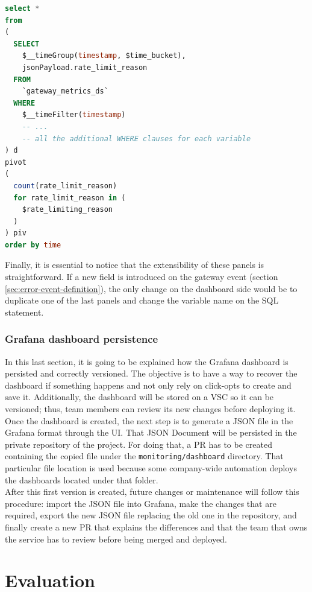 \documentclass[english, 12pt, a4paper, sci, utf8, a-1b, online]{aaltothesis}
\begin{document}
\begin{lstlisting}[language=sql,firstnumber=1]
select *
from
(
  SELECT
    $__timeGroup(timestamp, $time_bucket),
    jsonPayload.rate_limit_reason
  FROM 
    `gateway_metrics_ds`
  WHERE 
    $__timeFilter(timestamp)
    -- ...
    -- all the additional WHERE clauses for each variable
) d
pivot
(
  count(rate_limit_reason)
  for rate_limit_reason in (
    $rate_limiting_reason
  )
) piv
order by time
\end{lstlisting}

Finally, it is essential to notice that the extensibility of these panels is straightforward. If a new field is introduced on the gateway event (section \ref{sec:error-event-definition}), the only change on the dashboard side would be to duplicate one of the last panels and change the variable name on the SQL statement.

\subsubsection{Grafana dashboard persistence}

In this last section, it is going to be explained how the Grafana dashboard is persisted and correctly versioned. The objective is to have a way to recover the dashboard if something happens and not only rely on click-opts to create and save it. Additionally, the dashboard will be stored on a VSC so it can be versioned; thus, team members can review its new changes before deploying it.\\

Once the dashboard is created, the next step is to generate a JSON file in the Grafana format \cite{GrafanaJson} through the UI. That JSON Document will be persisted in the private repository of the project. For doing that, a PR has to be created containing the copied file under the \texttt{monitoring/dashboard} directory. That particular file location is used because some company-wide automation deploys the dashboards located under that folder.\\

After this first version is created, future changes or maintenance will follow this procedure: import the JSON file into Grafana, make the changes that are required, export the new JSON file replacing the old one in the repository, and finally create a new PR that explains the differences and that the team that owns the service has to review before being merged and deployed.

\clearpage
\section{Evaluation}
\end{document}

